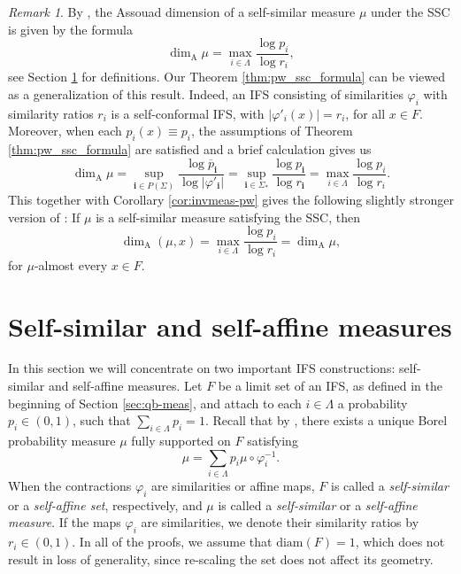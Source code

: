\documentclass{PRM}
\newcommand{\diam}{\mathrm{diam}}
\theoremstyle{plain}
\theoremstyle{definition}
\theoremstyle{remark}
\newtheorem{huom}[thm]{Remark}
\begin{document}
\begin{huom}\label{huom:ssm}
By \cite[Theorem 2.4]{FH}, the Assouad dimension of a self-similar measure $\mu$ under the SSC is given by the formula
\begin{equation}\label{eq:ssc_formula}
    \dim_{\mathrm{A}}\mu=\max_{i\in\Lambda}\frac{\log p_i}{\log r_i},
\end{equation}
see Section \ref{sec:ssm} for definitions. Our Theorem \ref{thm:pw_ssc_formula} can be viewed as a generalization of this result. Indeed, an IFS consisting of similarities $\varphi_i$ with similarity ratios $r_i$ is a self-conformal IFS, with $|\varphi'_i(x)|=r_i$, for all $x\in F$. Moreover, when each $p_i(x)\equiv p_i$, the assumptions of Theorem \ref{thm:pw_ssc_formula} are satisfied and a brief calculation gives us
\begin{equation*}
    \dim_{\mathrm{A}}\mu=\sup_{\mathbf{i}\in P(\Sigma)}\frac{\log \overline{p}_{\mathbf{i}}}{\log |\varphi'_{\mathbf{i}}|}=\sup_{\mathbf{i}\in \Sigma_*}\frac{\log p_{\mathbf{i}}}{\log r_{\mathbf{i}}}=\max_{i\in\Lambda}\frac{\log p_i}{\log r_i}.
\end{equation*}
This together with Corollary \ref{cor:invmeas-pw} gives the following slightly stronger version of \cite[Theorem 2.4]{FH}: If $\mu$ is a self-similar measure satisfying the SSC, then
\begin{equation*}
    \dim_{\mathrm{A}}(\mu,x)=\max_{i\in\Lambda}\frac{\log p_i}{\log r_i}=\dim_{\mathrm{A}}\mu,
\end{equation*}
for $\mu$-almost every $x\in F$.
\end{huom}

\section{Self-similar and self-affine measures}\label{sec:ssm}
In this section we will concentrate on two important IFS constructions: self-similar and self-affine measures. Let $F$ be a limit set of an IFS, as defined in the beginning of Section \ref{sec:qb-meas}, and attach to each $i\in\Lambda$ a probability $p_i\in(0,1)$, such that $\sum_{i\in\Lambda}p_i=1$. Recall that by \cite{H}, there exists a unique Borel probability measure $\mu$ fully supported on $F$ satisfying
\begin{equation*}
    \mu=\sum_{i\in\Lambda}p_i\mu\circ \varphi_i^{-1}.
\end{equation*}
When the contractions $\varphi_i$ are similarities or affine maps, $F$ is called a \emph{self-similar} or a \emph{self-affine set}, respectively, and $\mu$ is called a \emph{self-similar} or a \emph{self-affine measure}. If the maps $\varphi_i$ are similarities, we denote their similarity ratios by $r_i\in(0,1)$. In all of the proofs, we assume that $\diam(F)=1$, which does not result in loss of generality, since re-scaling the set does not affect its geometry.
\end{document}
